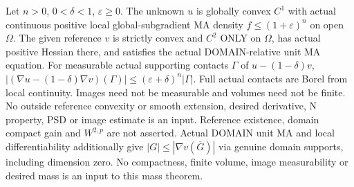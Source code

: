 \begin{lemma}
  \label{lem:convex-reference-contact-measure}
  \leanok
  Let $n>0$, $0<\delta<1$, $\varepsilon\ge0$. The unknown $u$ is globally
  convex $C^1$ with actual continuous positive local global-subgradient MA density
  $f\le(1+\varepsilon)^n$ on open $\Omega$. The given reference $v$ is
  strictly convex and $C^2$ ONLY on $\Omega$, has actual positive Hessian there,
  and satisfies the actual DOMAIN-relative unit MA equation. For measurable
  actual supporting contacts $\Gamma$ of $u-(1-\delta)v$,
  $| (\nabla u-(1-\delta)\nabla v)(\Gamma)|\le
  (\varepsilon+\delta)^n|\Gamma|$. Full actual contacts are Borel from local
  continuity. Images need not be measurable and volumes need not be finite.
  No outside reference convexity or smooth extension, desired derivative,
  N property, PSD or image estimate is an input. Reference existence, domain
  compact gain and $W^{2,p}$ are not asserted. Actual DOMAIN unit MA and local
  differentiability additionally give $|G|\le|\nabla v(\overline G)|$ via
  genuine domain supports, including dimension zero. No compactness, finite
  volume, image measurability or desired mass is an input to this mass theorem.
\end{lemma}
